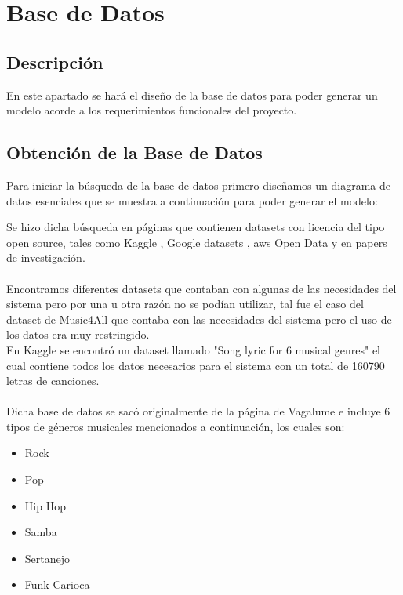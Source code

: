 \documentclass[12pt, a4paper, titlepage]{report}
\begin{document}
\section{Base de Datos} %
		\subsection{Descripción}
		En este apartado se hará el diseño de la base de datos para poder generar un modelo acorde a los requerimientos funcionales del proyecto.
		
		\subsection{Obtención de la Base de Datos}
		Para iniciar la búsqueda de la base de datos primero diseñamos un diagrama de datos esenciales que se muestra a continuación para poder generar el modelo:
		
		
		Se hizo dicha búsqueda en páginas que contienen datasets con licencia del tipo open source, tales como Kaggle \cite{kaggle}, Google datasets \cite{googleDatasets}, \acrshort{aws} Open Data \cite{awsOpenData} y en papers de investigación.\\\\
		Encontramos diferentes datasets que contaban con algunas de las necesidades del sistema pero por una u otra razón no se podían utilizar, tal fue el caso del dataset de Music4All \cite{music4all} que contaba con las necesidades del sistema pero el uso de los datos era muy restringido.\\

		En Kaggle \cite{kaggle} se encontró un dataset llamado "Song lyric for 6 musical genres" \cite{kaggleDataset} el cual contiene todos los datos necesarios para el sistema con un total de 160790 letras de canciones.\\\\
		
		Dicha base de datos se sacó originalmente de la página de Vagalume \cite{vagalume} e incluye 6 tipos de géneros musicales mencionados a continuación, los cuales son:
		\begin{itemize}
			\item Rock
			\item Pop
			\item Hip Hop
			\item Samba
			\item Sertanejo
			\item Funk Carioca
		\end{itemize}
	
\end{document}
